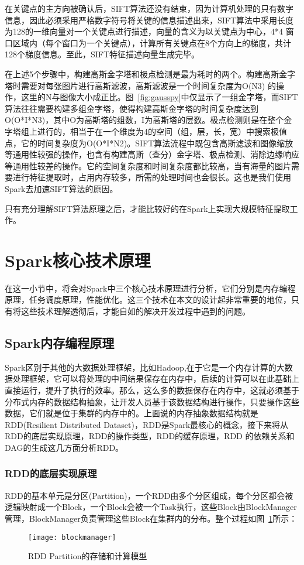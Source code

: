 在关键点的主方向被确认后，SIFT算法还没有结束，因为计算机处理的只有数字信息，因此必须采用严格数字符号将关键的信息描述出来，SIFT算法中采用长度为128的一维向量对一个关键点进行描述，向量的含义为以关键点为中心，4*4 窗口区域内（每个窗口为一个关键点），计算所有关键点在8个方向上的梯度，共计128个梯度信息。至此，SIFT特征描述向量生成完毕。

在上述5个步骤中，构建高斯金字塔和极点检测是最为耗时的两个。构建高斯金字塔时需要对每张图片进行高斯滤波，高斯滤波是一个时间复杂度为O(N3) 的操作，这里的N与图像大小成正比。图~\ref{fig:gausspy}中仅显示了一组金字塔，而SIFT算法往往需要构建多组金字塔，使得构建高斯金字塔的时间复杂度达到O(O*I*N3)，其中O为高斯塔的组数，I为高斯塔的层数。极点检测则是在整个金字塔组上进行的，相当于在一个维度为4的空间（组，层，长，宽）中搜索极值点，它的时间复杂度为O(O*I*N2)。SIFT算法流程中既包含高斯滤波和图像缩放等通用性较强的操作，也含有构建高斯（查分）金字塔、极点检测、消除边缘响应等通用性较差的操作。它的空间复杂度和时间复杂度都比较高，当有海量的图片需要进行特征提取时，占用内存较多，所需的处理时间也会很长。这也是我们使用Spark去加速SIFT算法的原因。

只有充分理解SIFT算法原理之后，才能比较好的在Spark上实现大规模特征提取工作。

\section{Spark核心技术原理}
在这一小节中，将会对Spark中三个核心技术原理进行分析，它们分别是内存编程原理，任务调度原理，性能优化。这三个技术在本文的设计起非常重要的地位，只有将这些技术理解透彻后，才能自如的解决开发过程中遇到的问题。
\subsection{Spark内存编程原理}
Spark区别于其他的大数据处理框架，比如Hadoop,在于它是一个内存计算的大数据处理框架，它可以将处理的中间结果保存在内存中，后续的计算可以在此基础上直接运行，提升了执行的效率。那么，这么多的数据保存在内存中，这就必须基于分布式内存的数据结构抽象，让开发人员基于该数据结构进行操作，只要操作这些数据，它们就是位于集群的内存中的。上面说的内存抽象数据结构就是RDD(Resilient Distributed Dataset)，RDD是Spark最核心的概念，接下来将从RDD的底层实现原理，RDD的操作类型，RDD的缓存原理，RDD 的依赖关系和DAG的生成这几方面分析RDD。
\subsubsection{RDD的底层实现原理}
RDD的基本单元是分区(Partition)，一个RDD由多个分区组成，每个分区都会被逻辑映射成一个Block，一个Block会被一个Task执行，这些Block由BlockManager管理，BlockManager负责管理这些Block在集群内的分布。整个过程如图~\ref{fig:blockmanager}所示：
\begin{figure}[htp]
\centering
\texttt{[image: blockmanager]}
\caption{RDD Partition的存储和计算模型}
\label{fig:blockmanager}
\end{figure}

